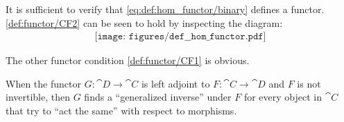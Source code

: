 \begin{defproof}
  It is sufficient to verify that \eqref{eq:def:hom_functor/binary} defines a functor. \ref{def:functor/CF2} can be seen to hold by inspecting the diagram:
  \begin{equation}\label{eq:def:hom_functor/inv_composition}
    \begin{aligned}
      \texttt{[image: figures/def\_\_hom\_functor.pdf]}
    \end{aligned}
  \end{equation}

  The other functor condition \ref{def:functor/CF1} is obvious.
\end{defproof}

\begin{remark}\label{rem:adjoint_functors}\cite{StanfordPlato:category_theory}
  When the functor \( G: \cat{D} \to \cat{C} \) is left adjoint to \( F: \cat{C} \to \cat{D} \) and \( F \) is not invertible, then \( G \) finds a \enquote{generalized inverse} under \( F \) for every object in \( \cat{C} \) that try to \enquote{act the same} with respect to morphisms.
\end{remark}

